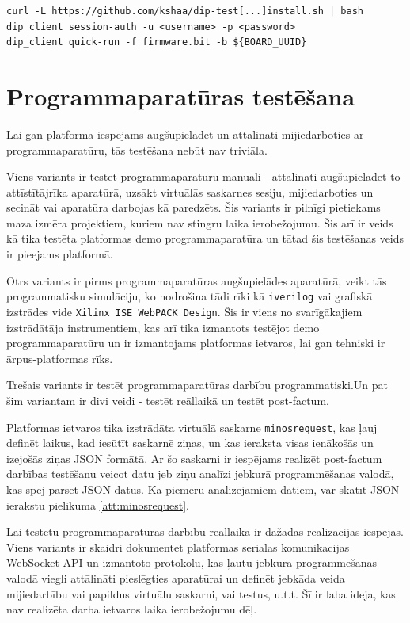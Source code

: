 \begin{lstlisting}[caption={Platformas klienta lietošanas uzsākšana},label={lst:setup},captionpos=b]
curl -L https://github.com/kshaa/dip-test[...]install.sh | bash
dip_client session-auth -u <username> -p <password>
dip_client quick-run -f firmware.bit -b ${BOARD_UUID}
\end{lstlisting}

\section{Programmaparatūras testēšana}
\label{sec:testing}

Lai gan platformā iespējams augšupielādēt un attālināti mijiedarboties ar
programmaparatūru, tās testēšana nebūt nav triviāla.

Viens variants ir testēt programmaparatūru manuāli - attālināti augšupielādēt to
attīstītājrīka aparatūrā, uzsākt virtuālās saskarnes sesiju, mijiedarboties un
secināt vai aparatūra darbojas kā paredzēts. Šis variants ir pilnīgi pietiekams
maza izmēra projektiem, kuriem nav stingru laika ierobežojumu. Šis arī ir veids
kā tika testēta platformas demo programmaparatūra un tātad šis testēšanas veids
ir pieejams platformā.

Otrs variants ir pirms programmaparatūras augšupielādes aparatūrā, veikt tās
programmatisku simulāciju, ko nodrošina tādi rīki kā \lstinline!iverilog! vai
grafiskā izstrādes vide \lstinline!Xilinx ISE WebPACK Design!. Šis ir viens no
svarīgākajiem izstrādātāja instrumentiem, kas arī tika izmantots testējot demo
programmaparatūru un ir izmantojams platformas ietvaros, lai gan tehniski ir
ārpus-platformas rīks.

Trešais variants ir testēt programmaparatūras darbību programmatiski.Un pat šim
variantam ir divi veidi - testēt reāllaikā un testēt post-factum. 

Platformas ietvaros tika izstrādāta virtuālā saskarne \lstinline!minosrequest!,
kas ļauj definēt laikus, kad iesūtīt saskarnē ziņas, un kas ieraksta visas
ienākošās un izejošās ziņas JSON formātā. Ar šo saskarni ir iespējams realizēt
post-factum darbības testēšanu veicot datu jeb ziņu analīzi jebkurā
programmēšanas valodā, kas spēj parsēt JSON datus. Kā piemēru analizējamiem
datiem, var skatīt JSON ierakstu pielikumā \ref{att:minosrequest}.

Lai testētu programmaparatūras darbību reāllaikā ir dažādas realizācijas
iespējas. Viens variants ir skaidri dokumentēt platformas seriālās komunikācijas
WebSocket API un izmantoto protokolu, kas ļautu jebkurā programmēšanas valodā
viegli attālināti pieslēgties aparatūrai un definēt jebkāda veida mijiedarbību
vai papildus virtuālu saskarni, vai testus, u.t.t. Šī ir laba ideja, kas nav
realizēta darba ietvaros laika ierobežojumu dēļ.

